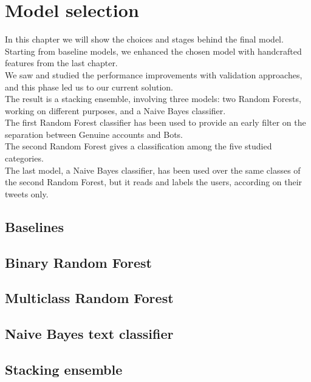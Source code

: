 \chapter{Model selection}
\label{capitolo5}
\thispagestyle{empty}

In this chapter we will show the choices and stages behind the final model.
Starting from baseline models, we enhanced the chosen model with handcrafted features from the last chapter.\\
We saw and studied the performance improvements with validation approaches, and this phase led us to our current solution.\\
The result is a stacking ensemble, involving three models: two Random Forests, working on different purposes, and a Naive Bayes classifier.\\
The first Random Forest classifier has been used to provide an early filter on the separation between Genuine accounts and Bots.\\
The second Random Forest gives a classification among the five studied categories.\\
The last model, a Naive Bayes classifier, has been used over the same classes of the second Random Forest, but it reads and labels the users, according on their tweets only.

\section{Baselines}
\section{Binary Random Forest}
\section{Multiclass Random Forest}
\section{Naive Bayes text classifier}
\section{Stacking ensemble}
